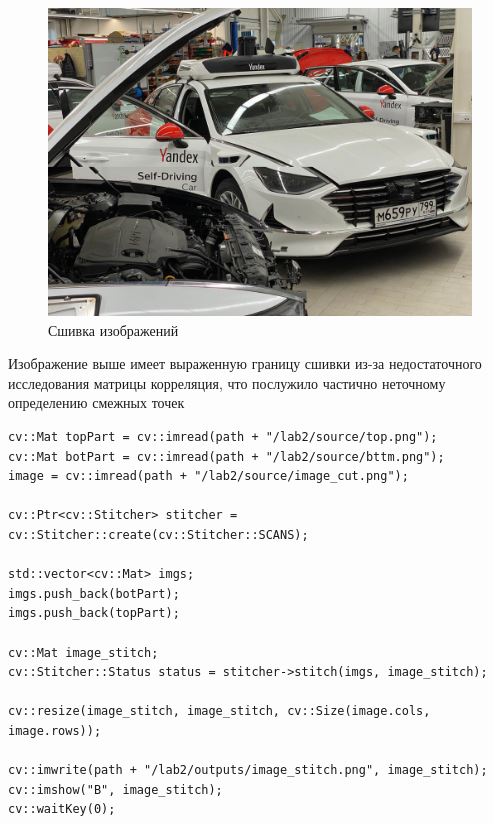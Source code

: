 \pagebreak

\begin{figure}[ht]
    \includegraphics[width=\textwidth]{../outputs/image_glues.png}
    \caption{Сшивка изображений}
    \label{fig:stitched_images}
\end{figure}

Изображение выше имеет выраженную границу сшивки из-за недостаточного исследования матрицы корреляция, что послужило частично неточному определению смежных точек

\begin{lstlisting}[style=cpp_white, caption={Исходный код для сшивки изображений с использованием библиотеки OpenCV}]
cv::Mat topPart = cv::imread(path + "/lab2/source/top.png");
cv::Mat botPart = cv::imread(path + "/lab2/source/bttm.png");
image = cv::imread(path + "/lab2/source/image_cut.png");

cv::Ptr<cv::Stitcher> stitcher = cv::Stitcher::create(cv::Stitcher::SCANS);

std::vector<cv::Mat> imgs;
imgs.push_back(botPart);
imgs.push_back(topPart);

cv::Mat image_stitch;
cv::Stitcher::Status status = stitcher->stitch(imgs, image_stitch);

cv::resize(image_stitch, image_stitch, cv::Size(image.cols, image.rows));

cv::imwrite(path + "/lab2/outputs/image_stitch.png", image_stitch);
cv::imshow("B", image_stitch);
cv::waitKey(0);
\end{lstlisting}

